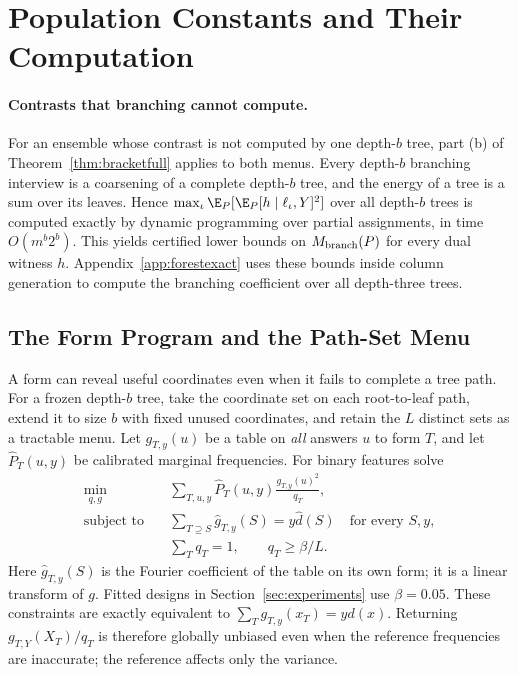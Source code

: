 \section{Population Constants and Their Computation}\label{app:E}


\paragraph{Contrasts that branching cannot compute.}
For an ensemble whose contrast is not computed by one depth-$b$ tree, part (b)
of Theorem~\ref{thm:bracketfull} applies to both menus. Every depth-$b$ branching interview is a coarsening of
a complete depth-$b$ tree, and the energy of a tree is a sum over its leaves.
Hence $\max_\iota\E_P[\E_P[h\mid\ell_\iota,Y]^2]$ over all depth-$b$ trees is
computed exactly by dynamic programming over partial assignments, in time
$O(m^b2^b)$. This yields certified lower bounds on $M_{\rm branch}(P)$ for every
dual witness $h$. Appendix~\ref{app:forestexact} uses these bounds inside
column generation to compute the branching coefficient over all depth-three
trees.



\subsection{The Form Program and the Path-Set Menu}\label{sec:pathdesign}
A form can reveal useful coordinates even when it fails to complete a tree path. For a frozen depth-$b$ tree, take the coordinate set on each root-to-leaf path, extend it to size $b$ with fixed unused coordinates, and retain the $L$ distinct sets as a tractable menu. Let $g_{T,y}(u)$ be a table on \emph{all} answers $u$ to form $T$, and let $\widehat P_T(u,y)$ be calibrated marginal frequencies. For binary features solve
\begin{align}
 \min_{q,g}\quad&\sum_{T,u,y}\widehat P_T(u,y)
                       \frac{g_{T,y}(u)^2}{q_T},\label{eq:fullprogram}\\
 \text{subject to}\quad&\sum_{T\supseteq S}\widehat g_{T,y}(S)
                   =y\widehat d(S)\quad\text{for every }S,y,\nonumber\\
 &\sum_Tq_T=1,\qquad q_T\ge\beta/L.\nonumber
\end{align}
Here $\widehat g_{T,y}(S)$ is the Fourier coefficient of the table on its own form; it is a linear transform of $g$. Fitted designs in Section~\ref{sec:experiments} use $\beta=0.05$. These constraints are exactly equivalent to $\sum_Tg_{T,y}(x_T)=yd(x)$. Returning $g_{T,Y}(X_T)/q_T$ is therefore globally unbiased even when the reference frequencies are inaccurate; the reference affects only the variance.

